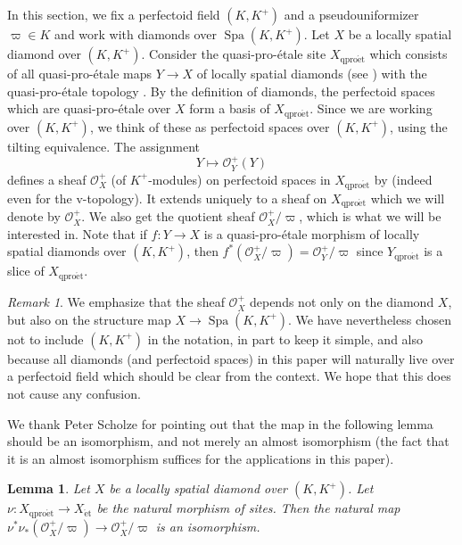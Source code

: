 \documentclass{amsart}
\newtheorem{lemma}[subsubsection]{Lemma}
\theoremstyle{remark}
\newtheorem{remark}[subsubsection]{Remark}
\numberwithin{equation}{subsection}
\newcommand{\cO}{{\mathcal O}}
\DeclareMathOperator{\Spa}{Spa}
\newcommand{\et}{\mathrm{\acute{e}t}}
\newcommand{\qp}{\mathrm{qpro\acute{e}t}}
\renewcommand{\(}{\left(}
\renewcommand{\)}{\right)}
\begin{document}
In this section, we fix a perfectoid field $(K,K^{+})$ and a pseudouniformizer $\varpi\in K$ and work with diamonds over $\Spa(K,K^{+})$. Let $X$ be a locally spatial diamond over $(K,K^{+})$. Consider the quasi-pro-\'etale site $X_{\qp}$ which consists of all quasi-pro-\'etale maps $Y \to X$ of locally spatial diamonds (see \cite[Definition 10.1]{diamonds})
with the quasi-pro-\'etale topology \cite[Definition 14.1]{diamonds}. By the definition of diamonds, the perfectoid spaces which are quasi-pro-\'etale over $X$ form a basis of $X_{\qp}$. Since we are working over $(K,K^{+})$, we think of these as perfectoid spaces over $(K,K^{+})$, using the tilting equivalence. The assignment
$$ Y \mapsto \cO_{Y}^{+}(Y) $$
defines a sheaf $\cO_{X}^{+}$ (of $K^{+}$-modules) on perfectoid spaces in $X_{\qp}$ by \cite[Theorem 8.7]{diamonds} (indeed even for the v-topology). It extends uniquely to a sheaf on $X_{\qp}$ which we will denote by $\cO_{X}^{+}$. We also get the quotient sheaf $\cO_{X}^{+}/\varpi$, which is what we will be interested in. Note that if $f\colon Y \to X$ is a quasi-pro-\'etale morphism of locally spatial diamonds over $(K,K^{+})$, then $f^{\ast}(\cO^{+}_{X}/\varpi)=\cO^{+}_{Y}/\varpi$ since $Y_{\qp}$ is a slice of $X_{\qp}$.

\begin{remark}
We emphasize that the sheaf $\cO_{X}^{+}$ depends not only on the diamond $X$, but also on the structure map $X \to \Spa(K,K^{+})$. We have nevertheless chosen not to include $(K,K^{+})$ in the notation, in part to keep it simple, and also because all diamonds (and perfectoid spaces) in this paper will naturally live over a perfectoid field which should be clear from the context. We hope that this does not cause any confusion.
\end{remark}

We thank Peter Scholze for pointing out that the map in the following lemma should be an isomorphism, and not merely an almost isomorphism (the fact that it is an almost isomorphism suffices for the applications in this paper).

\begin{lemma}
Let $X$ be a locally spatial diamond over $(K,K^{+})$. Let $\nu \colon X_{\qp} \to X_{\et}$ be the natural morphism of sites. Then the natural map $\nu^{\ast}\nu_{\ast}(\cO^{+}_{X}/\varpi) \to \cO_{X}^{+}/\varpi$ is an isomorphism.
\end{lemma}
\end{document}
